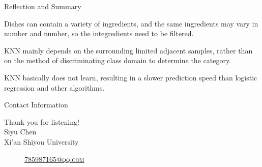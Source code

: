 \documentclass[
 size=14pt,
 paper=smartboard,  %
 mode=present, 		%
 display=slides, 	%
 style=tuliplab,  	%
 pauseslide,
 fleqn,leqno]{powerdot}
\begin{document}
\begin{slide}[toc=,bm=]{Reflection and Summary}

\begin{center}
\begin{itemize}

\item
\smallskip
\large
{Dishes can contain a variety of ingredients, and the same ingredients may vary in number and number, so the integredients need to be filtered.
  \item 
  KNN mainly depends on the surrounding limited adjacent samples, rather than on the method of discriminating class domain to determine the category.\\

\item
KNN basically does not learn, resulting in a slower prediction speed than logistic regression and other algorithms.
}

\end{itemize}
\end{center}
\end{slide}




\begin{wideslide}[toc=,bm=]{Contact Information}
\centering
{}
\twocolumn[
lcolwidth=0.35\linewidth,
rcolwidth=0.65\linewidth
]
{
}
{
Thank you for listening!\\
Siyu Chen\\
Xi'an Shiyou University\\
\begin{description}
 \item[\textcolor{orange}{\faEnvelope}] \href{mailto:785987165@qq.com}
 {\textsc{\footnotesize{785987165@qq.com}}}

 
\end{description}
}
\end{wideslide}
\end{document}
